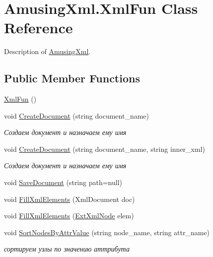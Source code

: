 \hypertarget{class_amusing_xml_1_1_xml_fun}{
\section{AmusingXml.XmlFun Class Reference}
\label{class_amusing_xml_1_1_xml_fun}
}


Description of \hyperlink{namespace_amusing_xml}{AmusingXml}.  


\subsection*{Public Member Functions}
\begin{DoxyCompactItemize}
\item 
\hyperlink{class_amusing_xml_1_1_xml_fun_a1531304c24acea3d9378f0e238760c9c}{XmlFun} ()
\item 
void \hyperlink{class_amusing_xml_1_1_xml_fun_a2b0d8652f90041bdeff2ea7823615e31}{CreateDocument} (string document\_\-name)
\begin{DoxyCompactList}\small\item\em Создаем документ и назначаем ему имя \item\end{DoxyCompactList}\item 
void \hyperlink{class_amusing_xml_1_1_xml_fun_a69258c79fe8838e764088dea2364eec9}{CreateDocument} (string document\_\-name, string inner\_\-xml)
\begin{DoxyCompactList}\small\item\em Создаем документ и назначаем ему имя \item\end{DoxyCompactList}\item 
void \hyperlink{class_amusing_xml_1_1_xml_fun_a9b0ae0134d0d376e3c9d05072cc77af3}{SaveDocument} (string path=null)
\item 
void \hyperlink{class_amusing_xml_1_1_xml_fun_a0031c915715492d683f7677af0b845da}{FillXmlElements} (XmlDocument doc)
\item 
void \hyperlink{class_amusing_xml_1_1_xml_fun_a2c8a45a2a6ad18ee38d42d0272e6037c}{FillXmlElements} (\hyperlink{class_amusing_xml_1_1_ext_xml_node}{ExtXmlNode} elem)
\item 
void \hyperlink{class_amusing_xml_1_1_xml_fun_a4cb1f3ab30abf83e406d533edbbb8b4d}{SortNodesByAttrValue} (string node\_\-name, string attr\_\-name)
\begin{DoxyCompactList}\small\item\em сортируем узлы по значению аттрибута \item\end{DoxyCompactList}\item 

\end{DoxyCompactItemize}
